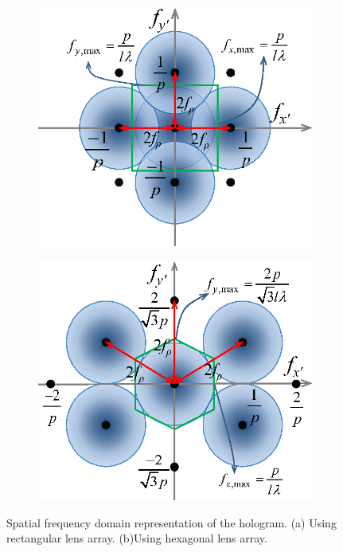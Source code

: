 \documentclass[10pt,letterpaper]{article}
\begin{document}
\begin{figure}[htb]
\centering
	\captionsetup[subfigure]{justification=centering}
	\begin{subfigure}[b]{0.4\linewidth}
	\centering
	\includegraphics[width=1\columnwidth]{hex_ana_0}
	\caption{}
	\end{subfigure}
	\begin{subfigure}[b]{0.4\linewidth}
	\includegraphics[width=1\columnwidth]{hex_ana_1}
	\centering
	\caption{}
	\end{subfigure}
\caption{Spatial frequency domain representation of the hologram. (a) Using rectangular lens array. (b)Using hexagonal lens array.}
\label{fig_5}
\end{figure}
\end{document}
